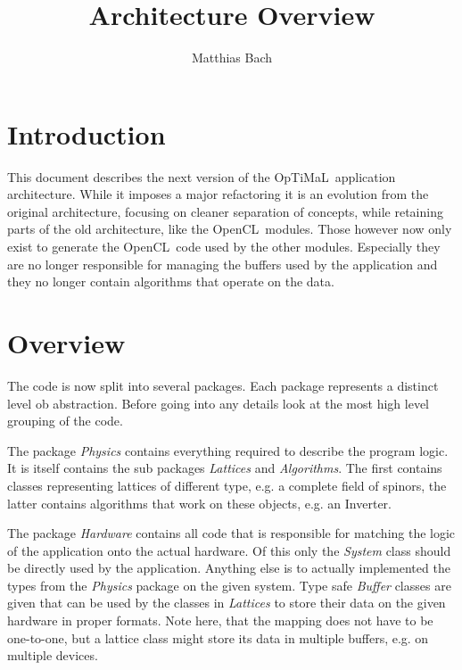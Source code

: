\documentclass[twoside,a4paper]{article}
\title{\Optimal Architecture Overview}
\author{Matthias Bach}
\begin{document}
\newcommand{\Optimal}{OpTiMaL~}
\newcommand{\OpenCL}[0]{OpenCL\texttrademark~}
\newcommand{\class}[1]{\emph{#1}}
\newcommand{\package}[1]{\emph{#1}}

\maketitle

\tableofcontents

\section{Introduction}

This document describes the next version of the \Optimal application architecture.
While it imposes a major refactoring it is an evolution from the original architecture, focusing on cleaner separation of concepts, while retaining parts of the old architecture, like the \OpenCL modules.
Those however now only exist to generate the \OpenCL code used by the other modules.
Especially they are no longer responsible for managing the buffers used by the application and they no longer contain algorithms that operate on the data.

\section{Overview}

The code is now split into several packages.
Each package represents a distinct level ob abstraction. Before going into any details look at the most high level grouping of the code.

The package \package{Physics} contains everything required to describe the program logic.
It is itself contains the sub packages \package{Lattices} and \package{Algorithms}.
The first contains classes representing lattices of different type, e.g. a complete field of spinors, the latter contains algorithms that work on these objects, e.g. an Inverter.

The package \package{Hardware} contains all code that is responsible for matching the logic of the application onto the actual hardware.
Of this only the \class{System} class should be directly used by the application.
Anything else is to actually implemented the types from the \package{Physics} package on the given system.
Type safe \class{Buffer} classes are given that can be used by the classes in \package{Lattices} to store their data on the given hardware in proper formats.
Note here, that the mapping does not have to be one-to-one, but a lattice class might store its data in multiple buffers, e.g. on multiple devices.
\end{document}
